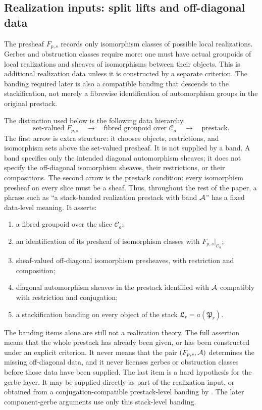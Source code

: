 ﻿\subsection{Realization inputs: split lifts and off-diagonal data}\label{subsec:realization-inputs}

The presheaf $F_{p,s}$ records only isomorphism classes of possible local
realizations. Gerbes and obstruction classes require more: one must have actual
groupoids of local realizations and sheaves of isomorphisms between their
objects. This is additional realization data unless it is constructed by a
separate criterion. The banding required later is also a compatible banding
that descends to the stackification, not merely a fibrewise identification of
automorphism groups in the original prestack.

The distinction used below is the following data hierarchy.
\[
\text{set-valued }F_{p,s}
\quad\longrightarrow\quad
\text{fibred groupoid over }\mathcal C_a
\quad\longrightarrow\quad
\text{prestack}.
\]
The first arrow is extra structure: it chooses objects, restrictions, and
isomorphism sets above the set-valued presheaf. It is not supplied by a band. A
band specifies only the intended diagonal automorphism sheaves; it does not
specify the off-diagonal isomorphism sheaves, their restrictions, or their
compositions. The second arrow is the prestack condition: every isomorphism
presheaf on every slice must be a sheaf. Thus, throughout the rest of the paper,
a phrase such as ``a stack-banded realization prestack with band $\mathcal{A}$'' has a fixed
data-level meaning. It asserts:
\begin{enumerate}[label=(\alph*),nosep]
\item a fibred groupoid over the slice $\mathcal C_a$;
\item an identification of its presheaf of isomorphism classes with
$F_{p,s}|_{\mathcal C_a}$;
\item sheaf-valued off-diagonal isomorphism presheaves, with restriction and
composition;
\item diagonal automorphism sheaves in the prestack identified with $\mathcal{A}$
compatibly with restriction and conjugation;
\item a stackification banding on every object of the stack
$\mathfrak L_r=a(\mathfrak P_r)$.
\end{enumerate}
The banding items alone are still not a realization theory. The full assertion
means that the whole prestack has already been given, or has been constructed
under an explicit criterion. It never means that the pair $(F_{p,s},\mathcal{A})$
determines the missing off-diagonal data, and it never licenses gerbes or
obstruction classes before those data have been supplied. The last item is a
hard hypothesis for the gerbe layer. It may be supplied directly as part of the
realization input, or obtained from a conjugation-compatible prestack-level
banding by . The later component-gerbe
arguments use only this stack-level banding.


